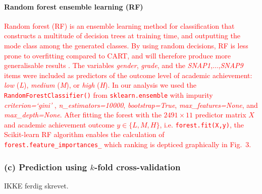 \documentclass[10pt,letterpaper]{article}
\begin{document}
{{\paragraph{Random forest ensemble learning (RF)}
\textcolor{red}{Random forest (RF) is an ensemble learning method for classification that constructs a multitude of decision trees at training time, and outputting the mode class among 
the generated classes. By using random decisions, RF is less prone to overfitting compared to CART, and will therefore produce more generalisable results \cite{Breiman2001}.  
The variables {\it gender}, {\it grade}, and the {\it SNAP1},$\ldots$,{\it SNAP9} items were included as predictors of the outcome level of academic achievement:
{\it low} ({\it L}), {\it medium} ({\it M}), or {\it high} ({\it H}).
In our analysis we used the {\tt \small RandomForestClassifier()}  from {\tt \small sklearn.ensemble} with impurity {\it criterion=`gini'} ,
{\it n\_estimators=10000}, {\it bootstrap=True}, {\it max\_features=None}, and {\it max\_depth=None}. 
After fitting the forest with the $2491 \times 11$ predictor matrix $X$ and academic achievement outcome $y \in \{L, M, H\} $, i.e. {\tt \small forest.fit(X,y)}, the 
Scikit-learn RF algorithm enables the calculation of {\tt \small forest.feature\_importances\_} which ranking is depticed graphically in Fig.~3.}



\subsubsection*{(c) Prediction using $k$-fold cross-validation} IKKE ferdig skrevet.


}}
\end{document}
